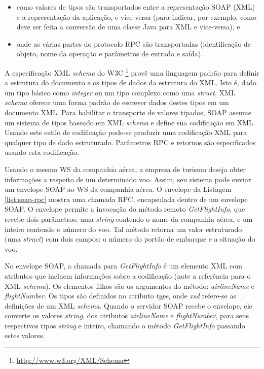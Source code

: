\begin{itemize}
	\item como valores de tipos são transportados entre  a representação SOAP (XML)
   e a representação da aplicação, e vice-versa (para indicar, por exemplo,
   como deve ser feita a conversão de uma classe Java para XML e vice-versa), e
   \item onde as várias partes do protocolo RPC são transportadas (identificação
   de objeto, nome da operação e parâmetros de entrada e saída).
\end{itemize}

A especificação XML \textit{schema} do W3C \footnote{\url{http://www.w3.org/XML/Schema}} provê uma linguagem padrão
para definir a estrutura do documento e os tipos de dados da estrutura do XML. Isto é,
dado um tipo básico como \textit{integer} ou um tipo complexo como uma \textit{struct}, XML \textit{schema} oferece
uma forma padrão de escrever dados destes tipos em um documento XML. Para habilitar o transporte
de valores tipados, SOAP assume um sistema de tipos baseado em XML \textit{schema}
e define sua codificação em XML. Usando este estilo de codificação pode-se produzir
uma codificação XML para qualquer tipo de dado estruturado.
Parâmetros RPC e retornos são especificados usando esta codificação.

Usando o mesmo WS da companhia aérea, a empresa de turismo
deseja obter informações a respeito de um determinado voo. Assim, seu
sistema pode enviar um envelope SOAP ao WS da companhia aérea.
O envelope da Listagem \ref{list:soap-rpc} mostra uma chamada RPC, encapsulada
dentro de um envelope SOAP. O envelope permite a invocação do método remoto 
\textit{GetFlightInfo}, que recebe dois parâmetros: uma \textit{string} contendo o nome da companhia 
aérea, e um inteiro contendo o número do voo. Tal método retorna um valor estruturado
(uma \textit{struct}) com dois campos: o número do portão de embarque e a situação do voo.

No envelope SOAP, a chamada para \textit{GetFlightInfo} é um elemento XML com atributos
que incluem informações sobre a codificação (note a referência para o XML \textit{schema}). 
Os elementos filhos são os argumentos do método: \textit{airlineName} e \textit{flightNumber}. 
Os tipos são definidos no atributo \textit{type}, onde \textit{xsd} refere-se as definições
de um XML \textit{schema}. Quando o servidor SOAP recebe o envelope, ele converte os valores
\textit{string}, dos atributos \textit{airlineName} e \textit{flightNumber}, para seus
respectivos tipos \textit{string} e inteiro, chamando o método \textit{GetFlightInfo}
passando estes valores.

